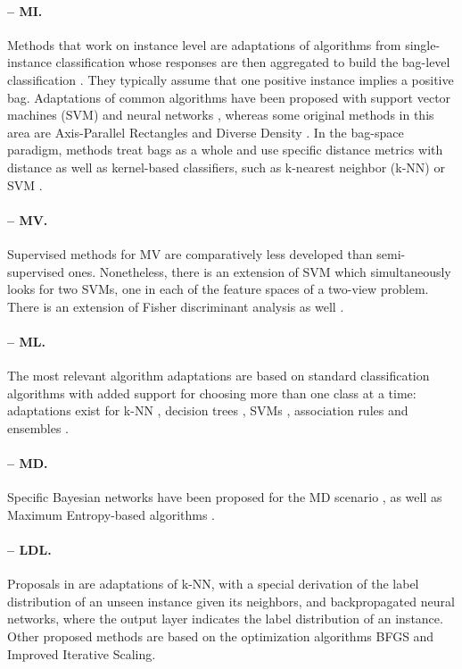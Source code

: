 \paragraph{-- MI.} 
Methods that work on instance level are adaptations of algorithms from single-instance classification whose responses are then aggregated to build the bag-level classification \cite{mic-taxonomy}. They typically assume that one positive instance implies a positive bag. Adaptations of common algorithms have been proposed with support vector machines (SVM) \cite{mi-svm} and neural networks \cite{mi-nn}, whereas some original methods in this area are Axis-Parallel Rectangles \cite{mi-apr} and Diverse Density \cite{mi-framework}. In the bag-space paradigm, methods treat bags as a whole and use specific distance metrics with distance as well as kernel-based classifiers, such as k-nearest neighbor (k\nobreakdash-NN) \cite{mi-knn} or SVM \cite{mi-kernel}.

\paragraph{-- MV.} Supervised methods for MV are comparatively less developed than semi-supervised ones. Nonetheless, there is an extension of SVM \cite{mv-svm} which simultaneously looks for two SVMs, one in each of the feature spaces of a two-view problem. There is an extension of Fisher discriminant analysis as well \cite{mv-fda}.

\paragraph{-- ML.} The most relevant algorithm adaptations \cite{mlmethods} are based on standard classification algorithms with added support for choosing more than one class at a time: adaptations exist for k-NN \cite{ml-knn}, decision trees \cite{ml-dt}, SVMs \cite{ml-svm}, association rules \cite{ml-rules} and ensembles \cite{mlensembles}.

\paragraph{-- MD.} Specific Bayesian networks have been proposed for the MD scenario \cite{md-bayes,md-bayes2}, as well as Maximum Entropy-based algorithms \cite{mdc,mdc-indep}.

\paragraph{-- LDL.} Proposals in \cite{ldl} are adaptations of k-NN, with a special derivation of the label distribution of an unseen instance given its neighbors, and backpropagated neural networks, where the output layer indicates the label distribution of an instance. Other proposed methods are based on the optimization algorithms BFGS and Improved Iterative Scaling. 

